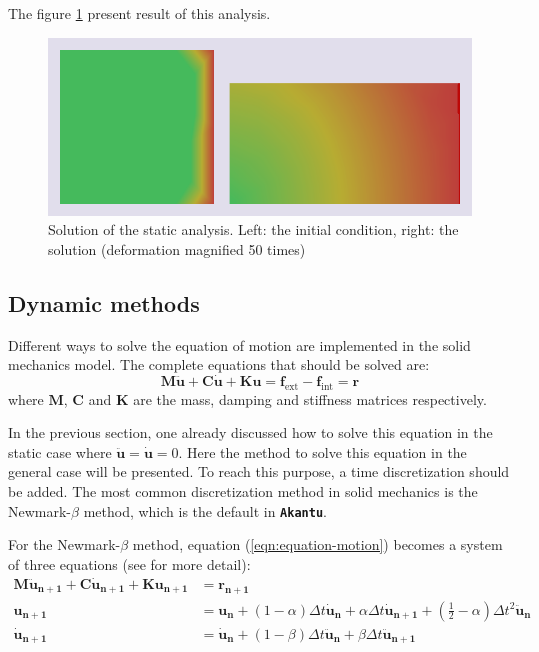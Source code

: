 \documentclass[a4paper,11pt]{book}
\newcommand{\akantu}{{\texttt{\textbf{Akantu}}}\xspace}
\renewcommand{\vec}[1]{\ensuremath{\boldsymbol{#1}}}
\newcommand{\mat}[1]{\ensuremath{\boldsymbol{#1}}}
\newcommand{\st}[1]{{\mathrm{#1}}}
\begin{document}
The figure \ref{fig:smm:implicit:static_solution} present result of this analysis.

\begin{figure}[!htb]
  \centering
  \includegraphics[width=.6\linewidth]{figures/static_analysis}
  \caption{Solution of the static  analysis. Left: the initial condition, right:
    the solution (deformation magnified 50 times)}
  \label{fig:smm:implicit:static_solution}
\end{figure}

\subsection{Dynamic methods} \label{sect:smm:Dynamic_methods}

Different ways  to solve  the equation  of motion are  implemented in  the solid
mechanics model.  The complete equations that should be solved are:
\begin{equation}\label{eqn:equation-motion}
  \mat{M}\vec{\ddot{u}}     +    \mat{C}\vec{\dot{u}}    +     \mat{K}\vec{u}    =
  \vec{f_{\st{ext}}} - \vec{f_{\st{int}}} = \vec{r}
\end{equation}
where $\mat{M}$,  $\mat{C}$ and  $\mat{K}$ are the  mass, damping  and stiffness
matrices respectively.

In the previous section, one already discussed how to solve this equation in the
static  case where $\vec{\ddot{u}}  = \vec{\dot{u}}  = 0$.   Here the  method to
solve  this equation  in the  general  case will  be presented.   To reach  this
purpose, a time discretization should  be added.  The most common discretization
method in solid mechanics is the Newmark-$\beta$ method, which is the default in
\akantu.

For the  Newmark-$\beta$ method, equation  (\ref{eqn:equation-motion}) becomes a
system  of three  equations  (see \cite{curnier92a}  \cite{hughes-83a} for  more
detail):
\begin{align}
  \mat{M}   \vec{\ddot{u}_{n+1}}  +   \mat{C}   \vec{\dot{u}_{n+1}}  +   \mat{K}
  \vec{u_{n+1}} &= \vec{r_{n+1}} \label{eqn:equation-motion-discret} \\
  \vec{u_{n+1}}   &=   \vec{u_{n}}   +   \left(1  -   \alpha\right)   \Delta   t
  \vec{\dot{u}_{n}} + \alpha \Delta  t \vec{\dot{u}_{n+1}} + \left(\frac{1}{2} -
    \alpha\right) \Delta t^2 \vec{\ddot{u}_n} \label{eqn:finite-difference-1}\\
  \vec{\dot{u}_{n+1}}  &= \vec{\dot{u}_{n}}  + \left(1  - \beta\right)  \Delta t
  \vec{\ddot{u}_{n}}            +            \beta           \Delta            t
  \vec{\ddot{u}_{n+1}} \label{eqn:finite-difference-2}
\end{align}
\end{document}
